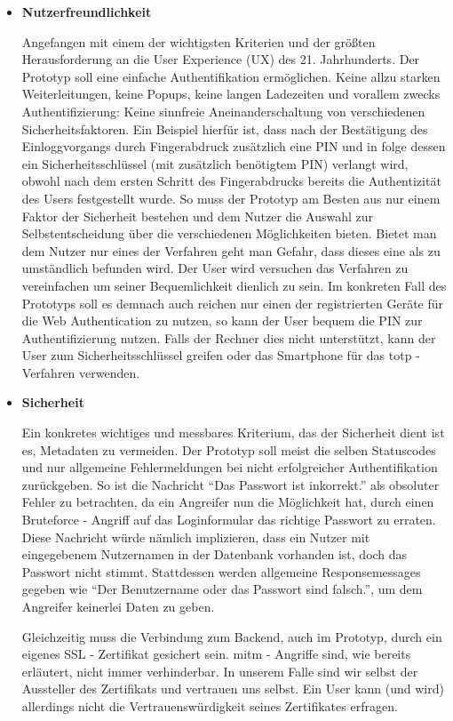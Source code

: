 \begin{itemize} 
\item \textbf{Nutzerfreundlichkeit}

Angefangen mit einem der wichtigsten Kriterien und der größten Herausforderung an die User Experience (UX) des 21. Jahrhunderts. Der Prototyp soll eine einfache Authentifikation ermöglichen. Keine allzu starken Weiterleitungen, keine Popups, keine langen Ladezeiten und vorallem zwecks Authentifizierung: Keine sinnfreie Aneinanderschaltung von verschiedenen Sicherheitsfaktoren. Ein Beispiel hierfür ist, dass nach der Bestätigung des Einloggvorgangs durch Fingerabdruck zusätzlich eine PIN und in folge dessen ein Sicherheitsschlüssel (mit zusätzlich benötigtem PIN) verlangt wird, obwohl nach dem ersten Schritt des Fingerabdrucks bereits die Authentizität des Users festgestellt wurde. So muss der Prototyp am Besten aus nur einem Faktor der Sicherheit bestehen und dem Nutzer die Auswahl zur Selbstentscheidung über die verschiedenen Möglichkeiten bieten. Bietet man dem Nutzer nur eines der Verfahren geht man Gefahr, dass dieses eine als zu umständlich befunden wird. Der User wird versuchen das Verfahren zu vereinfachen um seiner Bequemlichkeit dienlich zu sein. Im konkreten Fall des Prototyps soll es demnach auch reichen nur einen der registrierten Geräte für die Web Authentication zu nutzen, so kann der User bequem die PIN zur Authentifizierung nutzen. Falls der Rechner dies nicht unterstützt, kann der User zum Sicherheitsschlüssel greifen oder das Smartphone für das \ac{totp} - Verfahren verwenden.

\item \textbf{Sicherheit}

Ein konkretes wichtiges und messbares Kriterium, das der Sicherheit dient ist es, Metadaten zu vermeiden. Der Prototyp soll meist die selben Statuscodes und nur allgemeine Fehlermeldungen bei nicht erfolgreicher Authentifikation zurückgeben. So ist die Nachricht ``Das Passwort ist inkorrekt.'' als obsoluter Fehler zu betrachten, da ein Angreifer nun die Möglichkeit hat, durch einen Bruteforce - Angriff auf das Loginformular das richtige Passwort zu erraten. Diese Nachricht würde nämlich implizieren, dass ein Nutzer mit eingegebenem Nutzernamen in der Datenbank vorhanden ist, doch das Passwort nicht stimmt. Stattdessen werden allgemeine Responsemessages gegeben wie ``Der Benutzername oder das Passwort sind falsch.'', um dem Angreifer keinerlei Daten zu geben.

Gleichzeitig muss die Verbindung zum Backend, auch im Prototyp, durch ein eigenes SSL - Zertifikat gesichert sein. \ac{mitm} - Angriffe sind, wie bereits erläutert, nicht immer verhinderbar. In unserem Falle sind wir selbst der Aussteller des Zertifikats und vertrauen uns selbst. Ein User kann (und wird) allerdings nicht die Vertrauenswürdigkeit seines Zertifikates erfragen.


\end{itemize}

